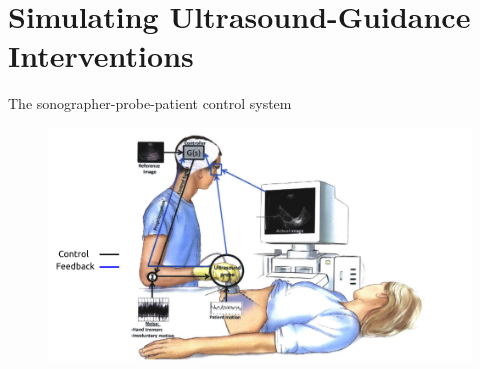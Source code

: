 \section{Simulating Ultrasound-Guidance Interventions}


{
\begin{frame}{The sonographer-probe-patient control system}
      \begin{figure}
        \centering
        \includegraphics[width=1.0\textwidth]{./figures/sonographer-probe-patient/versions/drawing-v00.png}
      \end{figure}
\end{frame}
}


